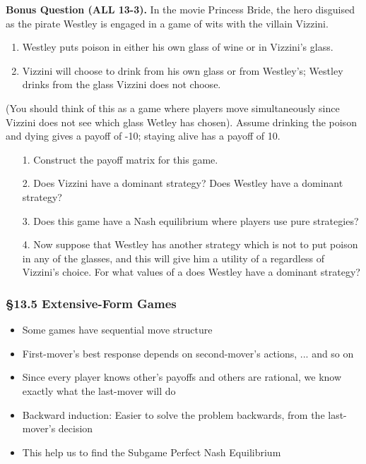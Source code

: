 \documentclass[12pt, xcolor=dvipsnames]{beamer}
\begin{document}
\begin{frame}
\small \textsf{\bfseries Bonus Question (ALL 13-3).} In the movie Princess Bride, the hero disguised as the pirate Westley is engaged in a game of wits with the villain Vizzini. 
\begin{enumerate}\itemsep-0.5ex 
\item Westley puts poison in either his own glass of wine or in Vizzini's glass.
\item Vizzini will choose to drink from his own glass or from Westley's; Westley drinks from the glass Vizzini does not choose.
\end{enumerate}
(You should think of this as a game where players move simultaneously since Vizzini does not see which glass Wetley has chosen). Assume drinking the poison and dying gives a payoff of -10; staying alive has a payoff of 10.
\end{frame}


\begin{frame}
\small
\begin{enumerate}\itemsep-0.5ex 
\item[1.] Construct the payoff matrix for this game. 
\item[2.] Does Vizzini have a dominant strategy? Does Westley have a dominant strategy? 
\item[3.] Does this game have a Nash equilibrium where players use pure strategies?
\item[4.] Now suppose that Westley has another strategy which is not to put poison in any of the glasses, and this will give him a utility of a regardless of Vizzini's choice. For what values of a does Westley have a dominant strategy?
\end{enumerate}
\end{frame}


\begin{frame}
\frametitle{\bf §13.5 Extensive-Form Games}
\begin{itemize}
\item Some games have sequential move structure
\item First-mover's best response depends on second-mover's actions, ... and so on
\item Since every player knows other's payoffs and others are rational, we know exactly what the last-mover will do
\item Backward induction: Easier to solve the problem backwards, from the last-mover's decision
\item This help us to find the Subgame Perfect Nash Equilibrium
\end{itemize}
\end{frame}
\end{document}
